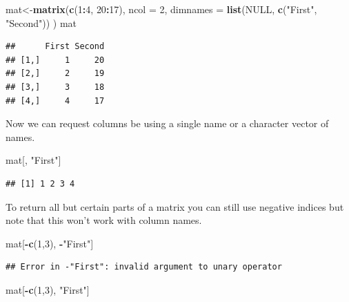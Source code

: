 \documentclass[
]{book}
\newenvironment{Shaded}{\begin{snugshade}}{\end{snugshade}}
\newcommand{\DataTypeTok}[1]{\textcolor[rgb]{0.13,0.29,0.53}{#1}}
\newcommand{\DecValTok}[1]{\textcolor[rgb]{0.00,0.00,0.81}{#1}}
\newcommand{\KeywordTok}[1]{\textcolor[rgb]{0.13,0.29,0.53}{\textbf{#1}}}
\newcommand{\NormalTok}[1]{#1}
\newcommand{\OperatorTok}[1]{\textcolor[rgb]{0.81,0.36,0.00}{\textbf{#1}}}
\newcommand{\OtherTok}[1]{\textcolor[rgb]{0.56,0.35,0.01}{#1}}
\newcommand{\StringTok}[1]{\textcolor[rgb]{0.31,0.60,0.02}{#1}}
\theoremstyle{definition}
\theoremstyle{definition}
\theoremstyle{definition}
\theoremstyle{remark}
\begin{document}
\begin{Shaded}
\begin{Highlighting}[]
\NormalTok{mat<-}\KeywordTok{matrix}\NormalTok{(}\KeywordTok{c}\NormalTok{(}\DecValTok{1}\OperatorTok{:}\DecValTok{4}\NormalTok{, }\DecValTok{20}\OperatorTok{:}\DecValTok{17}\NormalTok{), }\DataTypeTok{ncol =} \DecValTok{2}\NormalTok{,}
            \DataTypeTok{dimnames =} \KeywordTok{list}\NormalTok{(}\OtherTok{NULL}\NormalTok{, }\KeywordTok{c}\NormalTok{(}\StringTok{"First"}\NormalTok{, }\StringTok{"Second"}\NormalTok{))}
\NormalTok{            )}
\NormalTok{mat}
\end{Highlighting}
\end{Shaded}

\begin{verbatim}
##      First Second
## [1,]     1     20
## [2,]     2     19
## [3,]     3     18
## [4,]     4     17
\end{verbatim}

Now we can request columns be using a single name or a character vector of names.

\begin{Shaded}
\begin{Highlighting}[]
\NormalTok{mat[, }\StringTok{"First"}\NormalTok{]}
\end{Highlighting}
\end{Shaded}

\begin{verbatim}
## [1] 1 2 3 4
\end{verbatim}

To return all but certain parts of a matrix you can still use negative indices but note that this won't work with column names.

\begin{Shaded}
\begin{Highlighting}[]
\NormalTok{mat[}\OperatorTok{-}\KeywordTok{c}\NormalTok{(}\DecValTok{1}\NormalTok{,}\DecValTok{3}\NormalTok{), }\OperatorTok{-}\StringTok{"First"}\NormalTok{]}
\end{Highlighting}
\end{Shaded}

\begin{verbatim}
## Error in -"First": invalid argument to unary operator
\end{verbatim}

\begin{Shaded}
\begin{Highlighting}[]
\NormalTok{mat[}\OperatorTok{-}\KeywordTok{c}\NormalTok{(}\DecValTok{1}\NormalTok{,}\DecValTok{3}\NormalTok{), }\StringTok{"First"}\NormalTok{]}
\end{Highlighting}
\end{Shaded}
\end{document}
